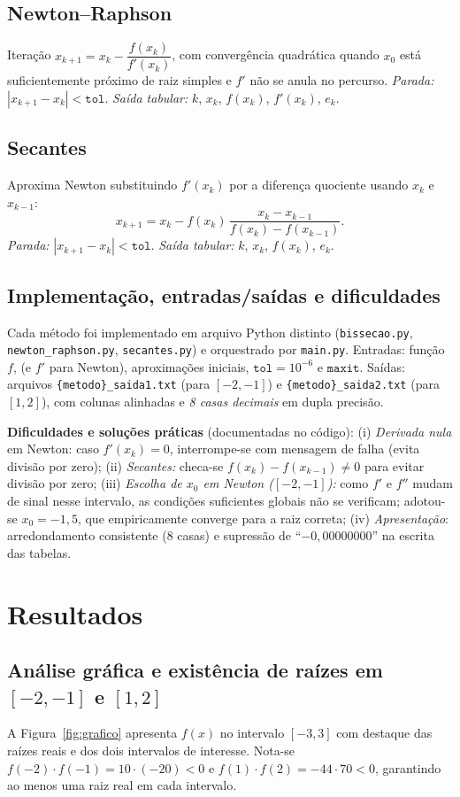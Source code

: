 \documentclass[12pt,a4paper]{article}
\begin{document}
\subsection{Newton--Raphson}
Iteração $x_{k+1}=x_k-\dfrac{f(x_k)}{f'(x_k)}$, com convergência quadrática quando $x_0$ está suficientemente próximo de raiz simples
e $f'$ não se anula no percurso. \emph{Parada:} $|x_{k+1}-x_k|<\texttt{tol}$.
\emph{Saída tabular:} $k$, $x_k$, $f(x_k)$, $f'(x_k)$, $e_k$.

\subsection{Secantes}
Aproxima Newton substituindo $f'(x_k)$ por a diferença quociente usando $x_{k}$ e $x_{k-1}$:
\[
x_{k+1}=x_k - f(x_k)\,\frac{x_k-x_{k-1}}{f(x_k)-f(x_{k-1})}.
\]
\emph{Parada:} $|x_{k+1}-x_k|<\texttt{tol}$.
\emph{Saída tabular:} $k$, $x_k$, $f(x_k)$, $e_k$.

\subsection{Implementação, entradas/saídas e dificuldades}
Cada método foi implementado em arquivo Python distinto (\texttt{bissecao.py}, \texttt{newton\_raphson.py}, \texttt{secantes.py})
e orquestrado por \texttt{main.py}. Entradas: função $f$, (e $f'$ para Newton), aproximações iniciais, $\texttt{tol}=10^{-6}$ e $\texttt{maxit}$.
Saídas: arquivos \texttt{\{metodo\}\_saida1.txt} (para $[-2,-1]$) e \texttt{\{metodo\}\_saida2.txt} (para $[1,2]$), com colunas alinhadas
e \emph{8 casas decimais} em dupla precisão.

\textbf{Dificuldades e soluções práticas} (documentadas no código):
(i) \emph{Derivada nula} em Newton: caso $f'(x_k)=0$, interrompe-se com mensagem de falha (evita divisão por zero);
(ii) \emph{Secantes:} checa-se $f(x_k)-f(x_{k-1})\neq 0$ para evitar divisão por zero; 
(iii) \emph{Escolha de $x_0$ em Newton ($[-2,-1]$):} como $f'$ e $f''$ mudam de sinal nesse intervalo, as condições suficientes globais não se verificam; adotou-se $x_0=-1{,}5$, que empiricamente converge para a raiz correta;
(iv) \emph{Apresentação}: arredondamento consistente (8 casas) e supressão de “$-0{,}00000000$” na escrita das tabelas.

\section{Resultados}
\subsection{Análise gráfica e existência de raízes em $[-2,-1]$ e $[1,2]$}
A Figura~\ref{fig:grafico} apresenta $f(x)$ no intervalo $[-3,3]$ com destaque das raízes reais e dos dois intervalos de interesse.
Nota-se $f(-2)\cdot f(-1)=10\cdot(-20)<0$ e $f(1)\cdot f(2)=-44\cdot 70<0$, garantindo ao menos uma raiz real em cada intervalo.
\end{document}
